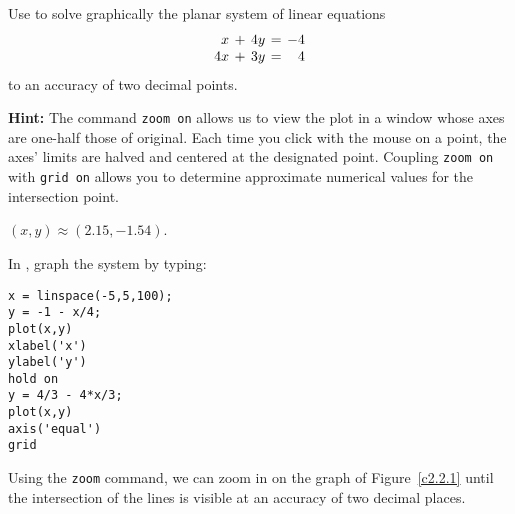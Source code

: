 \documentclass{ximera}
\begin{document}
\begin{computerExercise} \label{c2.2.1}
Use \Matlab to solve graphically the planar system of linear
equations
\[
\arraycolsep 2pt
\begin{array}{rcrcr}
 x & + & 4y & = & -4 \\
4x & + & 3y & = &  4
\end{array}
\]
to an accuracy of two decimal points.

{\bf Hint:} The \Matlab command {\tt zoom on}
allows us to
view the plot in a window whose axes are one-half those of
original.  Each time you click with the mouse on a point,
the axes' limits are halved and centered at the designated
point. Coupling {\tt zoom on} with {\tt grid on} allows you
to determine approximate numerical values for the intersection
point.

\begin{solution}

\ans $(x,y) \approx (2.15,-1.54)$.

\soln In \Matlab, graph the system by typing:
\begin{verbatim}
x = linspace(-5,5,100);
y = -1 - x/4;
plot(x,y)
xlabel('x')
ylabel('y')
hold on
y = 4/3 - 4*x/3;
plot(x,y)
axis('equal')
grid
\end{verbatim}

Using the {\tt zoom} command, we can zoom in on the graph of
Figure~\ref{c2.2.1} until the intersection of the lines is
visible at an accuracy of two decimal places.  

\begin{figure}[htb]
                       \centerline{%
                       }
\end{figure}

\end{solution}
\end{computerExercise}
\end{document}
